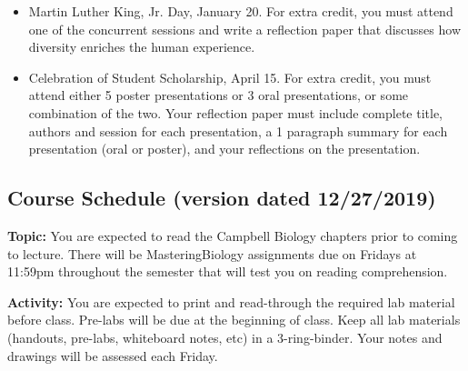 \documentclass{tufte-handout}
\begin{document}
\begin{fullwidth}
\begin{itemize}
\item Martin Luther King, Jr. Day, January 20. For extra credit, you must attend one of the concurrent sessions and write a reflection paper that discusses how diversity enriches the human experience. 
\item Celebration of Student Scholarship, April 15.  For extra credit, you must attend either 5 poster presentations or 3 oral presentations, or some combination of the two.  Your reflection paper must include complete title, authors and session for each presentation, a 1 paragraph summary for each presentation (oral or poster), and your reflections on the presentation.  	
\end{itemize}









\newpage
\subsection{Course Schedule (version dated 12/27/2019)}
%

\textbf{Topic:} You are expected to read the Campbell Biology chapters prior to coming to lecture.  There will be MasteringBiology assignments due on Fridays at 11:59pm throughout the semester that will test you on reading comprehension. 

\textbf{Activity:} You are expected to print and read-through the required lab material before class. Pre-labs will be due at the beginning of class. Keep all lab materials (handouts, pre-labs, whiteboard notes, etc) in a 3-ring-binder. Your notes and drawings will be assessed each Friday.


\end{fullwidth}
\end{document}
